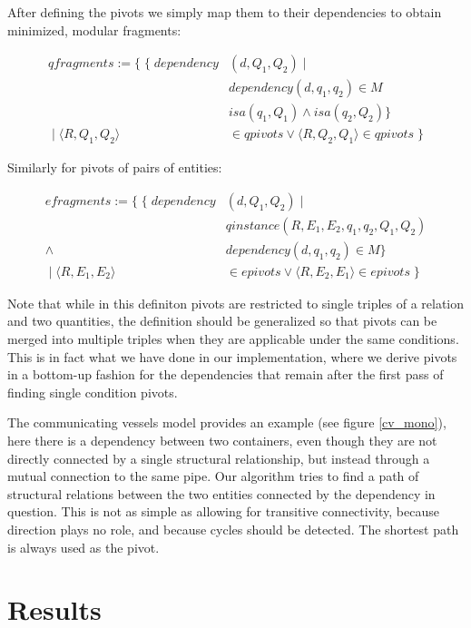 \documentclass{article} %
\begin{document}
After defining the pivots we simply map them to their dependencies to obtain
minimized, modular fragments:

\begin{align*}
qfragments := \{ \; \{ \; dependency&(d, Q_1, Q_2) \; | \; \\
		& dependency(d, q_1, q_2)  \in M \\
		& isa(q_1, Q_1) \land isa(q_2, Q_2) \} \\
	\; | \; \langle R, Q_1, Q_2 \rangle &\in qpivots \lor 
	\langle R, Q_2, Q_1 \rangle \in qpivots \; \}
\end{align*}

Similarly for pivots of pairs of entities:

\begin{align*}
efragments := \{ \; \{ \; dependency&(d, Q_1, Q_2) \; | \; \\
		& qinstance(R, E_1, E_2, q_1, q_2, Q_1, Q_2) \\
		\land \; & dependency(d, q_1, q_2)  \in M \} \\
	\; | \; \langle R, E_1, E_2 \rangle &\in epivots \lor 
	\langle R, E_2, E_1 \rangle \in epivots \; \}
\end{align*}

Note that while in this definiton pivots are restricted to single triples of a
relation and two quantities, the definition should be generalized so that
pivots can be merged into multiple triples when they are applicable under the
same conditions. This is in fact what we have done in our implementation,
where we derive pivots in a bottom-up fashion for the dependencies that remain
after the first pass of finding single condition pivots.

The communicating vessels model provides an example (see figure \ref{cv_mono}),
here there is a dependency between two containers, even though they are not
directly connected by a single structural relationship, but instead through
a mutual connection to the same pipe. Our algorithm tries to find a path of
structural relations between the two entities connected by the dependency in
question. This is not as simple as allowing for transitive connectivity,
because direction plays no role, and because cycles should be detected. The
shortest path is always used as the pivot.

\section{Results}
\end{document}
